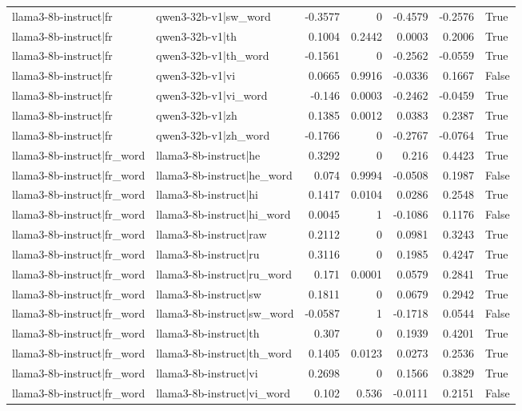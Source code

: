 \begin{table}
\begin{tabular}{l l r r r r l}
llama3-8b-instruct|fr & qwen3-32b-v1|sw_word & -0.3577 & 0 & -0.4579 & -0.2576 & True \\
llama3-8b-instruct|fr & qwen3-32b-v1|th & 0.1004 & 0.2442 & 0.0003 & 0.2006 & True \\
llama3-8b-instruct|fr & qwen3-32b-v1|th_word & -0.1561 & 0 & -0.2562 & -0.0559 & True \\
llama3-8b-instruct|fr & qwen3-32b-v1|vi & 0.0665 & 0.9916 & -0.0336 & 0.1667 & False \\
llama3-8b-instruct|fr & qwen3-32b-v1|vi_word & -0.146 & 0.0003 & -0.2462 & -0.0459 & True \\
llama3-8b-instruct|fr & qwen3-32b-v1|zh & 0.1385 & 0.0012 & 0.0383 & 0.2387 & True \\
llama3-8b-instruct|fr & qwen3-32b-v1|zh_word & -0.1766 & 0 & -0.2767 & -0.0764 & True \\
llama3-8b-instruct|fr_word & llama3-8b-instruct|he & 0.3292 & 0 & 0.216 & 0.4423 & True \\
llama3-8b-instruct|fr_word & llama3-8b-instruct|he_word & 0.074 & 0.9994 & -0.0508 & 0.1987 & False \\
llama3-8b-instruct|fr_word & llama3-8b-instruct|hi & 0.1417 & 0.0104 & 0.0286 & 0.2548 & True \\
llama3-8b-instruct|fr_word & llama3-8b-instruct|hi_word & 0.0045 & 1 & -0.1086 & 0.1176 & False \\
llama3-8b-instruct|fr_word & llama3-8b-instruct|raw & 0.2112 & 0 & 0.0981 & 0.3243 & True \\
llama3-8b-instruct|fr_word & llama3-8b-instruct|ru & 0.3116 & 0 & 0.1985 & 0.4247 & True \\
llama3-8b-instruct|fr_word & llama3-8b-instruct|ru_word & 0.171 & 0.0001 & 0.0579 & 0.2841 & True \\
llama3-8b-instruct|fr_word & llama3-8b-instruct|sw & 0.1811 & 0 & 0.0679 & 0.2942 & True \\
llama3-8b-instruct|fr_word & llama3-8b-instruct|sw_word & -0.0587 & 1 & -0.1718 & 0.0544 & False \\
llama3-8b-instruct|fr_word & llama3-8b-instruct|th & 0.307 & 0 & 0.1939 & 0.4201 & True \\
llama3-8b-instruct|fr_word & llama3-8b-instruct|th_word & 0.1405 & 0.0123 & 0.0273 & 0.2536 & True \\
llama3-8b-instruct|fr_word & llama3-8b-instruct|vi & 0.2698 & 0 & 0.1566 & 0.3829 & True \\
llama3-8b-instruct|fr_word & llama3-8b-instruct|vi_word & 0.102 & 0.536 & -0.0111 & 0.2151 & False \\

\end{tabular}
\end{table}
